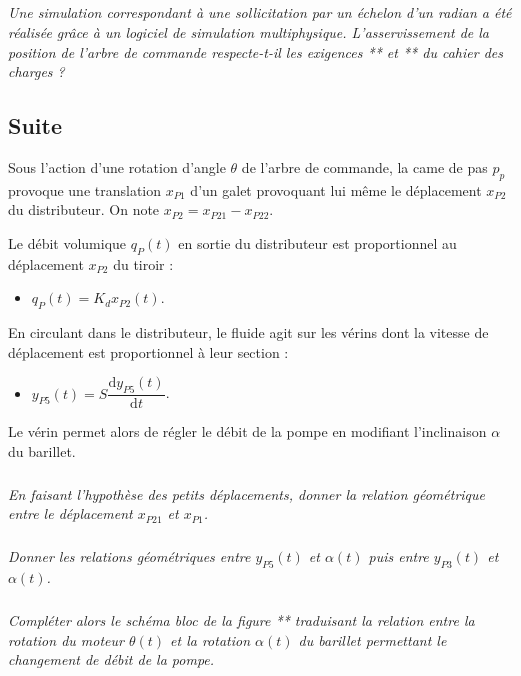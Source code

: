 \documentclass[10pt,fleqn]{article} %
\begin{document}
\begin{multicols}{2}
\begin{corrige}
\end{corrige}

\subparagraph{}
\textit{Une simulation correspondant à une sollicitation par un échelon d'un radian a été réalisée grâce à un logiciel de simulation multiphysique. L'asservissement de la position de l'arbre de commande respecte-t-il les exigences ** et ** du cahier des charges ?}
\begin{corrige}

\end{corrige}


\subsection*{Suite}

Sous l'action d'une rotation d'angle $\theta$ de l'arbre de commande, la came de pas $p_p$ provoque une translation $x_{P1}$ d'un galet provoquant lui même le déplacement $x_{P2}$ du distributeur. On note $x_{P2}=x_{P21}-x_{P22}$.

Le débit volumique $q_P(t)$ en sortie du distributeur est proportionnel au déplacement $x_{P2}$ du tiroir : 
\begin{itemize}
\item $q_P(t)=K_d x_{P2}(t)$.
\end{itemize}

En circulant dans le distributeur, le fluide agit sur les vérins dont la vitesse de déplacement est proportionnel à leur section : 
\begin{itemize}
\item $y_{P5}(t)= S \dfrac{\text{d}y_{P5}(t)}{\text{d}t}$.
\end{itemize}


Le vérin permet alors de régler le débit de la pompe en modifiant l'inclinaison $\alpha$ du barillet.


\subparagraph{}
\textit{En faisant l'hypothèse des petits déplacements, donner la relation géométrique entre le déplacement $x_{P21}$ et $x_{P1}$.}
\begin{corrige}

\end{corrige}

\subparagraph{}
\textit{Donner les relations géométriques entre $y_{P5}(t)$ et $\alpha(t)$ puis entre $y_{P3}(t)$ et $\alpha(t)$.}
\begin{corrige}

\end{corrige}

\subparagraph{}
\textit{Compléter alors le schéma bloc de la figure ** traduisant la relation entre la rotation du moteur $\theta(t)$ et la rotation $\alpha(t)$ du barillet permettant le changement de débit de la pompe.}
\begin{corrige}


\end{corrige}
\end{multicols}
\end{document}
